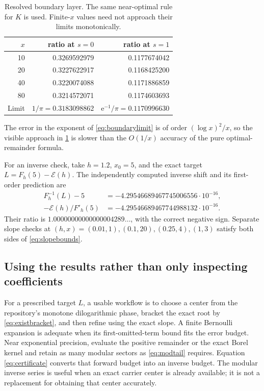 \documentclass[11pt,a4paper]{article}
\theoremstyle{definition}
\theoremstyle{remark}
\newcommand{\e}{\mathrm e}
\newcommand{\Ecal}{\mathcal E}
\begin{document}
\begin{table}[htbp]
\centering
\caption{Resolved boundary layer. The same near-optimal rule for $K$ is
used. Finite-$x$ values need not approach their limits monotonically.}
\label{tab:boundary}
\begin{tabular}{@{}rrr@{}}
\toprule
$x$&ratio at $s=0$&ratio at $s=1$\\
\midrule
10&0.3269592979&0.1177674042\\
20&0.3227622917&0.1168425200\\
40&0.3220074088&0.1171886859\\
80&0.3214572071&0.1174603693\\
\midrule
Limit&$1/\pi=0.3183098862$&$\e^{-1}/\pi=0.1170996630$\\
\bottomrule
\end{tabular}
\end{table}
The error in the exponent of \eqref{eq:boundarylimit} is of order
$(\log x)^2/x$, so the visible approach in \cref{tab:boundary} is slower
than the $O(1/x)$ accuracy of the pure optimal-remainder formula.

For an inverse check, take $h=1.2$, $x_0=5$, and the exact target
$L=F_h(5)-\Ecal(h)$. The independently computed inverse shift and its
first-order prediction are
\begin{align*}
 F_h^{-1}(L)-5&=-4.29546689467745006556\cdot10^{-16},\\
 -\Ecal(h)/F'_h(5)&=-4.29546689467744988132\cdot10^{-16}.
\end{align*}
Their ratio is $1.00000000000000004289\ldots$, with the correct negative
sign. Separate slope checks at $(h,x)=(0.01,1),(0.1,20),(0.25,4),(1,3)$
satisfy both sides of \eqref{eq:slopebounds}.

\subsection{Using the results rather than only inspecting coefficients}
For a prescribed target $L$, a usable workflow is to choose a center from
the repository's monotone dilogarithmic phase, bracket the exact root by
\eqref{eq:existbracket}, and then refine using the exact slope. A finite
Bernoulli expansion is adequate when its first-omitted-term bound fits the
error budget. Near exponential precision, evaluate the positive remainder
or the exact Borel kernel and retain as many modular sectors as
\eqref{eq:modtail} requires. Equation \eqref{eq:certificate} converts that
forward budget into an inverse budget. The modular inverse series is useful
when an exact carrier center is already available; it is not a replacement
for obtaining that center accurately.
\end{document}
